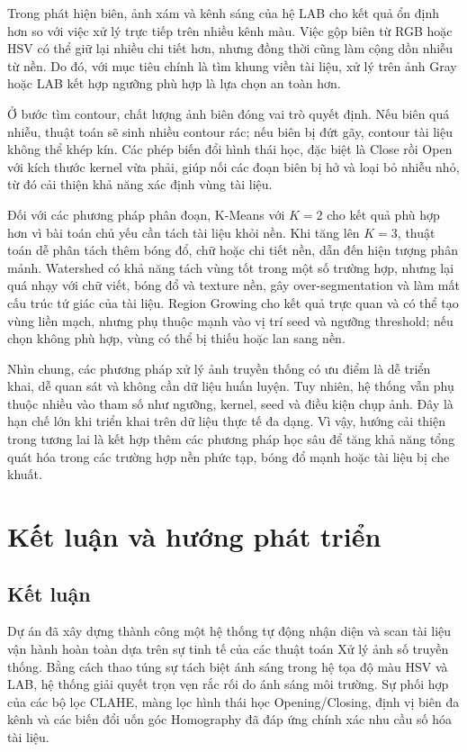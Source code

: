 \documentclass[12pt, a4paper]{report}
\begin{document}
Trong phát hiện biên, ảnh xám và kênh sáng của hệ LAB cho kết quả ổn định hơn so với việc xử lý trực tiếp trên nhiều kênh màu. Việc gộp biên từ RGB hoặc HSV có thể giữ lại nhiều chi tiết hơn, nhưng đồng thời cũng làm cộng dồn nhiễu từ nền. Do đó, với mục tiêu chính là tìm khung viền tài liệu, xử lý trên ảnh Gray hoặc LAB kết hợp ngưỡng phù hợp là lựa chọn an toàn hơn.

Ở bước tìm contour, chất lượng ảnh biên đóng vai trò quyết định. Nếu biên quá nhiễu, thuật toán sẽ sinh nhiều contour rác; nếu biên bị đứt gãy, contour tài liệu không thể khép kín. Các phép biến đổi hình thái học, đặc biệt là Close rồi Open với kích thước kernel vừa phải, giúp nối các đoạn biên bị hở và loại bỏ nhiễu nhỏ, từ đó cải thiện khả năng xác định vùng tài liệu.

Đối với các phương pháp phân đoạn, K-Means với $K=2$ cho kết quả phù hợp hơn vì bài toán chủ yếu cần tách tài liệu khỏi nền. Khi tăng lên $K=3$, thuật toán dễ phân tách thêm bóng đổ, chữ hoặc chi tiết nền, dẫn đến hiện tượng phân mảnh. Watershed có khả năng tách vùng tốt trong một số trường hợp, nhưng lại quá nhạy với chữ viết, bóng đổ và texture nền, gây over-segmentation và làm mất cấu trúc tứ giác của tài liệu. Region Growing cho kết quả trực quan và có thể tạo vùng liền mạch, nhưng phụ thuộc mạnh vào vị trí seed và ngưỡng threshold; nếu chọn không phù hợp, vùng có thể bị thiếu hoặc lan sang nền.

Nhìn chung, các phương pháp xử lý ảnh truyền thống có ưu điểm là dễ triển khai, dễ quan sát và không cần dữ liệu huấn luyện. Tuy nhiên, hệ thống vẫn phụ thuộc nhiều vào tham số như ngưỡng, kernel, seed và điều kiện chụp ảnh. Đây là hạn chế lớn khi triển khai trên dữ liệu thực tế đa dạng. Vì vậy, hướng cải thiện trong tương lai là kết hợp thêm các phương pháp học sâu để tăng khả năng tổng quát hóa trong các trường hợp nền phức tạp, bóng đổ mạnh hoặc tài liệu bị che khuất.


\chapter{Kết luận và hướng phát triển} 
\section{Kết luận}

Dự án đã xây dựng thành công một hệ thống tự động nhận diện và scan tài liệu vận hành hoàn toàn dựa trên sự tinh tế của các thuật toán Xử lý ảnh số truyền thống. Bằng cách thao túng sự tách biệt ánh sáng trong hệ tọa độ màu HSV và LAB, hệ thống giải quyết trọn vẹn rắc rối do ánh sáng môi trường. Sự phối hợp của các bộ lọc CLAHE, màng lọc hình thái học Opening/Closing, định vị biên đa kênh và các biến đổi uốn góc Homography đã đáp ứng chính xác nhu cầu số hóa tài liệu.
\end{document}
